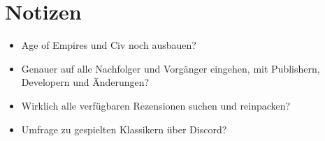 \section*{Notizen}
\begin{itemize}
    \item Age of Empires und Civ noch ausbauen?
    \item Genauer auf alle Nachfolger und Vorgänger eingehen, mit Publishern, Developern und Änderungen?
    \item Wirklich alle verfügbaren Rezensionen suchen und reinpacken?
    \item Umfrage zu gespielten Klassikern über Discord?
\end{itemize}